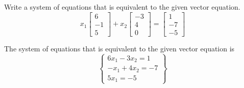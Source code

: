 \documentclass{../mathhomework}
\begin{document}
\begin{problem}[1.3\#5]
    Write a system of equations that is equivalent to the given vector equation.
    \begin{equation*}
        x_1\begin{bmatrix}
            6 \\ -1 \\ 5
        \end{bmatrix}
        + x_2\begin{bmatrix}
            -3 \\ 4 \\ 0
        \end{bmatrix}
        = \begin{bmatrix}
            1 \\ -7 \\ -5
        \end{bmatrix}
    \end{equation*}

    \begin{solution}
        The system of equations that is equivalent to the given vector equation is
        \begin{equation*}
            \begin{Bmatrix}
                6x_1 - 3x_2 = 1 \\
                -x_1 + 4x_2 = -7 \\
                5x_1 = -5
            \end{Bmatrix}
        \end{equation*}
    \end{solution}
\end{problem}
\end{document}
